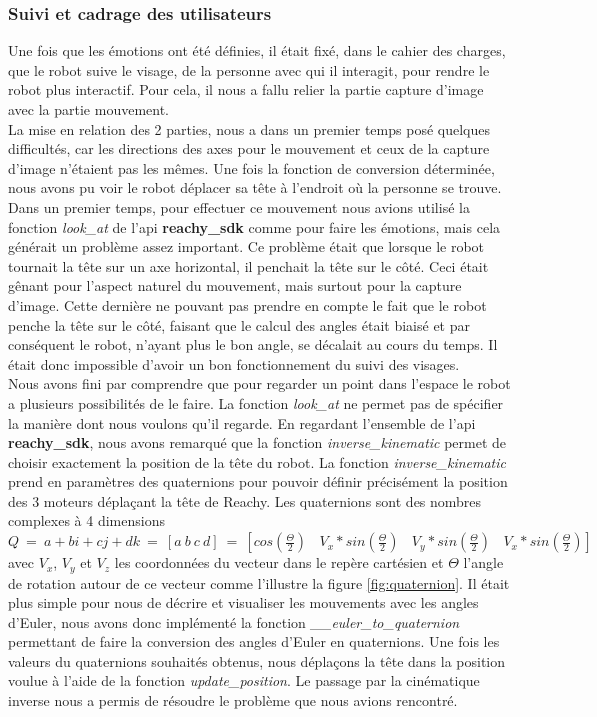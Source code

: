 \documentclass[a4paper,french]{article}
\begin{document}
\subsubsection{Suivi et cadrage des utilisateurs}
Une fois que les émotions ont été définies, il était fixé, dans le cahier des charges, que le robot suive le visage, de la personne avec qui il interagit, pour rendre le robot plus interactif. Pour cela, il nous a fallu relier la partie capture d'image avec la partie mouvement.\\

La mise en relation des 2 parties, nous a dans un premier temps posé quelques difficultés, car les directions des axes pour le mouvement et ceux de la capture d'image n'étaient pas les mêmes. Une fois la fonction de conversion déterminée, nous avons pu voir le robot déplacer sa tête à l'endroit où la personne se trouve. Dans un premier temps, pour effectuer ce mouvement nous avions utilisé la fonction \textit{look\_at} de l'api \textbf{reachy\_sdk} comme pour faire les émotions, mais cela générait un problème assez important. Ce problème était que lorsque le robot tournait la tête sur un axe horizontal, il penchait la tête sur le côté. Ceci était gênant pour l'aspect naturel du mouvement, mais surtout pour la capture d'image. Cette dernière ne pouvant pas prendre en compte le fait que le robot penche la tête sur le côté, faisant que le calcul des angles était biaisé et par conséquent le robot, n'ayant plus le bon angle, se décalait au cours du temps. Il était donc impossible d'avoir un bon fonctionnement du suivi des visages. \\

Nous avons fini par comprendre que pour regarder un point dans l'espace le robot a plusieurs possibilités de le faire. La fonction \textit{look\_at} ne permet pas de spécifier la manière dont nous voulons qu'il regarde. En regardant l'ensemble de l'api \textbf{reachy\_sdk}, nous avons remarqué que la fonction \textit{inverse\_kinematic} permet de choisir exactement la position de la tête du robot. La fonction \textit{inverse\_kinematic} prend en paramètres des quaternions pour pouvoir définir précisément la position des 3 moteurs déplaçant la tête de Reachy. Les quaternions sont des nombres complexes à 4 dimensions $Q\ =\ a+bi+cj+dk\ =\ [a\ b\ c\ d]\ =\ [cos(\frac{\Theta}{2})\ \ \ \ V_x*sin(\frac{\Theta}{2})\ \ \ \ V_y*sin(\frac{\Theta}{2})\ \ \ \ V_x*sin(\frac{\Theta}{2})]$ avec $V_x$, $V_y$ et $V_z$ les coordonnées du vecteur dans le repère cartésien et $\Theta$ l'angle de rotation autour de ce vecteur comme l'illustre la figure \ref{fig:quaternion}. Il était plus simple pour nous de décrire et visualiser les mouvements avec les angles d'Euler, nous avons donc implémenté la fonction \textit{\_\_euler\_to\_quaternion} permettant de faire la conversion des angles d'Euler en quaternions. Une fois les valeurs du quaternions souhaités obtenus, nous déplaçons la tête dans la position voulue à l'aide de la fonction \textit{update\_position}. Le passage par la cinématique inverse nous a permis de résoudre le problème que nous avions rencontré. \\ 
\end{document}
